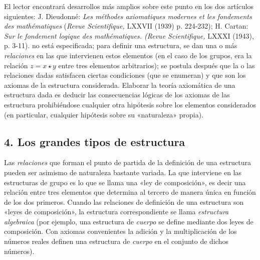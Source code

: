 \documentclass[a4paper, 12pt, draft]{article}
\begin{document}
{ El lector encontrará desarrollos más amplios sobre este punto en los dos artículos siguientes: J. Dieudonné: \textit{Les méthodes axiomatiques modernes et les fondements des mathématiques }(\textit{Revue Scientifique,} LXXVII (1939) p. 224-232); H. Cartan: \textit{Sur le fondement logique des mathématiques. (Revue Scientifique,} LXXXI (1943), p. 3-11).} no está especificada; para definir una estructura, se dan una o más \textit{relaciones} en las que intervienen estos elementos (en el caso de los grupos, era la relación $z=x\star y $ entre tres elementos arbitrarios); se postula después que la o las relaciones dadas satisfacen ciertas condiciones (que se enumeran) y que son los axiomas de la estructura considerada. Elaborar la teoría axiomática de una estructura dada es deducir las consecuencias lógicas de los axiomas de las estructura prohibiéndose cualquier otra hipótesis sobre los elementos considerados (en particular, cualquier hipótesis sobre su «naturaleza» propia).

\subsection*{4. Los grandes tipos de estructura} 

 Las \textit{relaciones} que forman el punto de partida de la definición de una estructura pueden ser asimismo de naturaleza bastante variada. La que interviene en las estructuras de grupo es lo que se llama una «ley de composición», es decir una relación entre tres elementos que determina al tercero de manera única en función de los dos primeros. Cuando las relaciones de definición de una estructura son «leyes de composición», la estructura correspondiente se llama \textit{estructura algebraica} (por ejemplo, una estructura de \textit{cuerpo} se define mediante dos leyes de composición. Con axiomas convenientes la adición y la multiplicación de los números reales definen una estructura de \textit{cuerpo} en el conjunto de dichos números).
\end{document}
